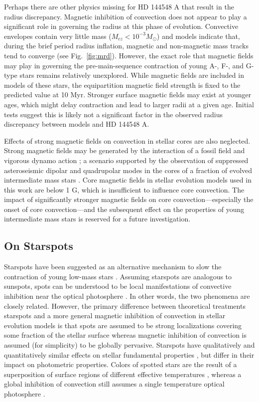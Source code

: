\documentclass{aa}
\begin{document}
Perhaps there are other physics missing for HD 144548 A that result in the radius discrepancy. Magnetic inhibition of convection does not appear to play a significant role in governing the radius at this phase of evolution. Convective envelopes contain very little mass ($M_{cz} < 10^{-3} M_{\odot}$) and models indicate that, during the brief period radius inflation, magnetic and non-magnetic mass tracks tend to converge (see Fig.~\ref{fig:mrd}). However, the exact role that magnetic fields may play in governing the pre-main-sequence contraction of young A-, F-, and G-type stars remains relatively unexplored. While magnetic fields are included in models of these stars, the equipartition magnetic field strength is fixed to the predicted value at 10 Myr. Stronger surface magnetic fields may exist at younger ages, which might delay contraction and lead to larger radii at a given age. Initial tests suggest this is likely not a significant factor in the observed radius discrepancy between models and HD 144548 A.

Effects of strong magnetic fields on convection in stellar cores are also neglected. Strong magnetic fields may be generated by the interaction of a fossil field and vigorous dynamo action \citep[e.g.,][]{Featherstone2009}; a scenario supported by the observation of suppressed asteroseismic dipolar and quadrupolar modes in the cores of a fraction of evolved intermediate mass stars \citep{Fuller2015,Stello2016a,Cantiello2016}. Core magnetic fields in stellar evolution models used in this work are below 1 G, which is insufficient to influence core convection. The impact of significantly stronger magnetic fields on core convection---especially the onset of core convection---and the subsequent effect on the properties of young intermediate mass stars is reserved for a future investigation. 

\subsection{On Starspots}
Starspots have been suggested as an alternative mechanism to slow the contraction of young low-mass stars \citep{Jackson2009, MM10, Jackson2014a, Somers2015b}. Assuming starspots are analogous to sunspots, spots can be understood to be local manifestations of convective inhibition near the optical photosphere \citep{Biermann1941,Deinzer1965}. In other words, the two phenomena are closely related. However, the primary difference between theoretical treatments starspots and a more general magnetic inhibition of convection in stellar evolution models is that spots are assumed to be strong localizations covering some fraction of the stellar surface whereas magnetic inhibition of convection is assumed (for simplicity) to be globally pervasive. Starspots have qualitatively and quantitatively similar effects on stellar fundamental properties \citep[radius, \teff, luminosity;][]{Spruit1982a,Spruit1986,Somers2015b}, but differ in their impact on photometric properties. Colors of spotted stars are the result of a superposition of surface regions of different effective temperatures \citep{Spruit1986}, whereas a global inhibition of convection still assumes a single temperature optical photosphere \citep{Jackson2014a}.
\end{document}

